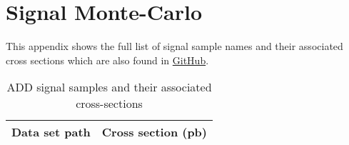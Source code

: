 \section{Signal Monte-Carlo}
\label{ch:appendix_signal_monte_carlo}

This appendix shows the full list of signal sample names and their associated cross sections which are also found in \href{https://github.com/cms-exotica-diphotons/diphoton-analysis/blob/dbd7b7b1ea7210aa55a27dcce8e84a3a5057d265/CommonClasses/interface/CrossSections.h}{GitHub}.


\begin{landscape}
\begin{table}[!htbp]
       \caption{ ADD signal samples and their associated cross-sections }
       \centering
       \vspace{\baselineskip}
       \begin{tabular}{lc}
       \hline \hline
       Data set path & Cross section (pb)\\
       \hline


\end{tabular}
\end{table}
\end{landscape}
